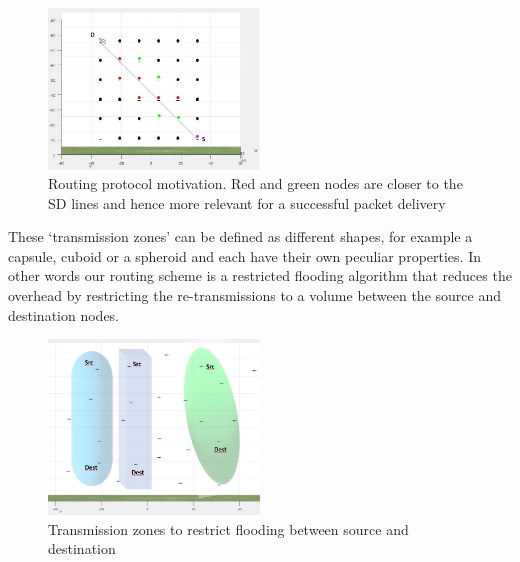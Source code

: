 \begin{figure}[hbtp]
\centering
\includegraphics[width=0.5\textwidth]{Chapter-3/figs/routing_motivation}
\caption{Routing protocol motivation. Red and green nodes are closer to the SD lines and hence more relevant for a successful packet delivery}
\label{fig:routing_motivation}
\end{figure}
These `transmission zones' can be defined as different shapes, for example a capsule, cuboid or a spheroid  and each have their own peculiar properties. In other words our routing scheme is a restricted flooding algorithm that reduces the overhead by restricting the re-transmissions to a volume between the source and destination nodes. 

\begin{figure}[hbtp]
\centering
\includegraphics[width=0.5\textwidth]{Chapter-3/figs/Zone_examples}
\caption{Transmission zones to restrict flooding between source and destination}
\label{fig:trans_zones_example}
\end{figure}

